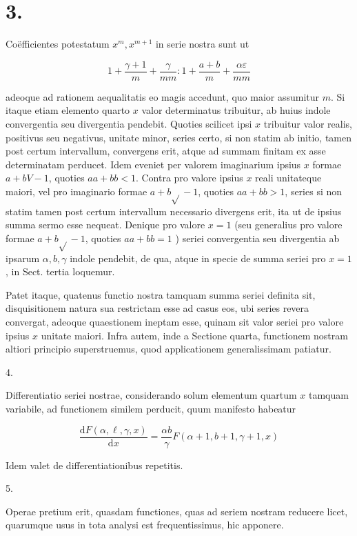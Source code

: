\documentclass[10pt]{article}
\begin{document}
\section*{3.}
Coëfficientes potestatum \(x^{m}, x^{m+1}\) in serie nostra sunt ut

\[
1+\frac{\gamma+1}{m}+\frac{\gamma}{m m}: 1+\frac{a+b}{m}+\frac{\alpha \varepsilon}{m m}
\]

adeoque ad rationem aequalitatis eo magis accedunt, quo maior assumitur \(m\). Si itaque etiam elemento quarto \(x\) valor determinatus tribuitur, ab huius indole convergentia seu divergentia pendebit. Quoties scilicet ipsi \(x\) tribuitur valor realis, positivus seu negativus, unitate minor, series certo, si non statim ab initio, tamen post certum intervallum, convergens erit, atque ad summam finitam ex asse determinatam perducet. Idem eveniet per valorem imaginarium ipsius \(x\) formae \(a+b V-1\), quoties \(a a+b b<1\). Contra pro valore ipsius \(x\) reali unitateque maiori, vel pro imaginario formae \(a+b \sqrt{ }-1\), quoties \(a a+b b>1\), series si non statim tamen post certum intervallum necessario divergens erit, ita ut de ipsius summa sermo esse nequeat. Denique pro valore \(x=1\) (seu generalius pro valore formae \(a+b \sqrt{ }-1\), quoties \(a a+b b=1\) ) seriei convergentia seu divergentia ab ipsarum \(\alpha, b, \gamma\) indole pendebit, de qua, atque in specie de summa seriei pro \(x=1\), in Sect. tertia loquemur.

Patet itaque, quatenus functio nostra tamquam summa seriei definita sit, disquisitionem natura sua restrictam esse ad casus eos, ubi series revera convergat, adeoque quaestionem ineptam esse, quinam sit valor seriei pro valore ipsius \(x\) unitate maiori. Infra autem, inde a Sectione quarta, functionem nostram altiori principio superstruemus, quod applicationem generalissimam patiatur.

4.

Differentiatio seriei nostrae, considerando solum elementum quartum \(x\) tamquam variabile, ad functionem similem perducit, quum manifesto habeatur

\[
\frac{\mathrm{d} F(\alpha, \ell, \gamma, x)}{\mathrm{d} x}=\frac{\alpha b}{\gamma} F(\alpha+1, b+1, \gamma+1, x)
\]

Idem valet de differentiationibus repetitis.

5.

Operae pretium erit, quasdam functiones, quas ad seriem nostram reducere licet, quarumque usus in tota analysi est frequentissimus, hic apponere.
\end{document}
